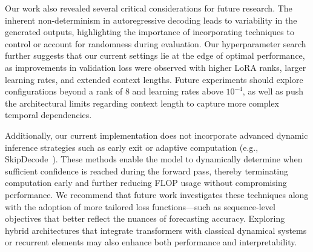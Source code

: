 \documentclass[a4paper,12pt]{article}
\begin{document}
  Our work also revealed several critical considerations for future research. The inherent non-determinism in autoregressive decoding leads to variability in the generated outputs, highlighting the importance of incorporating techniques to control or account for randomness during evaluation. Our hyperparameter search further suggests that our current settings lie at the edge of optimal performance, as improvements in validation loss were observed with higher LoRA ranks, larger learning rates, and extended context lengths. Future experiments should explore configurations beyond a rank of 8 and learning rates above $10^{-4}$, as well as push the architectural limits regarding context length to capture more complex temporal dependencies.
  
  Additionally, our current implementation does not incorporate advanced dynamic inference strategies such as early exit or adaptive computation (e.g., SkipDecode~\cite{delcorro2023skipdecode}). These methods enable the model to dynamically determine when sufficient confidence is reached during the forward pass, thereby terminating computation early and further reducing FLOP usage without compromising performance. We recommend that future work investigates these techniques along with the adoption of more tailored loss functions—such as sequence-level objectives that better reflect the nuances of forecasting accuracy. Exploring hybrid architectures that integrate transformers with classical dynamical systems or recurrent elements may also enhance both performance and interpretability.
  
\end{document}
